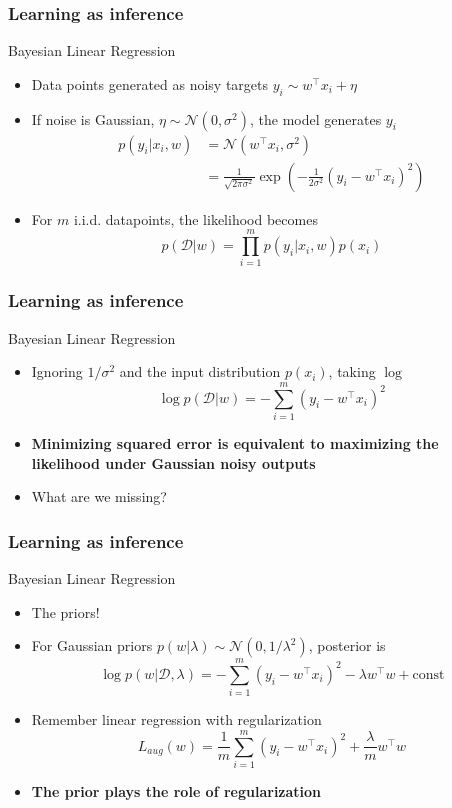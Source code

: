 \documentclass{beamer}
\begin{document}
\begin{frame}
	\frametitle{Learning as inference}
	\begin{block}{Bayesian Linear Regression}
	\begin{itemize}
	\item Data points generated as noisy targets $y_i \sim w^\top x_i + \eta$
	\item If noise is Gaussian, $\eta \sim \mathcal{N}(0,\sigma^2)$, the model generates $y_i$
	\begin{align*}
	p(y_i|x_i,w) & = \mathcal{N}(w^\top x_i,\sigma^2) \\
			& = \frac{1}{\sqrt{2\pi\sigma^2}}\exp\left(-\frac{1}{2\sigma^2}(y_i-w^\top x_i)^2 \right)
	\end{align*}
	\item For $m$ i.i.d. datapoints, the likelihood becomes
	$$p(\mathcal{D} | w) = \prod_{i=1}^m p(y_i|x_i,w)p(x_i)$$
	\end{itemize}
	\end{block}
\end{frame}


\begin{frame}
	\frametitle{Learning as inference}
	\begin{block}{Bayesian Linear Regression}
	\begin{itemize}[<+->]
	\item Ignoring $1/\sigma^2$ and the input distribution $p(x_i)$, taking $\log$
	$$\log p(\mathcal{D} | w) = -\sum_{i=1}^m (y_i-w^\top x_i)^2$$
	\item \textbf{Minimizing squared error is equivalent to maximizing the likelihood under Gaussian noisy outputs}
	\item What are we missing?
	\end{itemize}
	\end{block}
\end{frame}

\begin{frame}
	\frametitle{Learning as inference}
	\begin{block}{Bayesian Linear Regression}
	\begin{itemize}[<+->]
	\item The priors!
	\item For Gaussian priors $p(w|\lambda)\sim \mathcal{N}(0,1/\lambda^2)$, posterior is
	$$\log p(w| \mathcal{D},\lambda) = -\sum_{i=1}^m (y_i-w^\top x_i)^2 - \lambda w^\top w + \text{const}$$
	\item Remember linear regression with regularization
	$$L_{aug}(w) = \frac{1}{m} \sum_{i=1}^m (y_i-w^\top x_i)^2 + \frac{\lambda}{m} w^\top w$$
	\item \textbf{The prior plays the role of regularization}
	\end{itemize}
	\end{block}
\end{frame}
\end{document}
